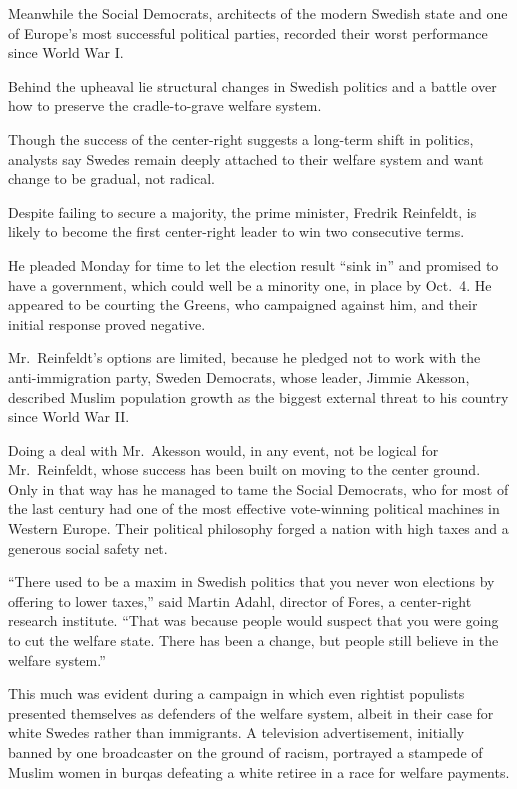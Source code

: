 ﻿\documentclass[12pt]{article}
\begin{document}
Meanwhile the Social Democrats, architects of the modern Swedish state and one of Europe's most
successful political parties, recorded their worst performance since World War I.

Behind the upheaval lie structural changes in Swedish politics and a battle over how to preserve the
cradle-to-grave welfare system.

Though the success of the center-right suggests a long-term shift in politics, analysts say Swedes
remain deeply attached to their welfare system and want change to be gradual, not radical.

Despite failing to secure a majority, the prime minister, Fredrik Reinfeldt, is likely to become the
first center-right leader to win two consecutive terms.

He pleaded Monday for time to let the election result ``sink in'' and promised to have a government,
which could well be a minority one, in place by Oct.~4. He appeared to be courting the Greens, who
campaigned against him, and their initial response proved negative.

Mr.~Reinfeldt's options are limited, because he pledged not to work with the anti-immigration party,
Sweden Democrats, whose leader, Jimmie Akesson, described Muslim population growth as the biggest
external threat to his country since World War II.

Doing a deal with Mr.~Akesson would, in any event, not be logical for Mr.~Reinfeldt, whose success
has been built on moving to the center ground. Only in that way has he managed to tame the Social
Democrats, who for most of the last century had one of the most effective vote-winning political
machines in Western Europe. Their political philosophy forged a nation with high taxes and a
generous social safety net.

``There used to be a maxim in Swedish politics that you never won elections by offering to lower
taxes,'' said Martin Adahl, director of Fores, a center-right research institute. ``That was because
people would suspect that you were going to cut the welfare state. There has been a change, but
people still believe in the welfare system.''

This much was evident during a campaign in which even rightist populists presented themselves as
defenders of the welfare system, albeit in their case for white Swedes rather than immigrants. A
television advertisement, initially banned by one broadcaster on the ground of racism, portrayed a
stampede of Muslim women in burqas defeating a white retiree in a race for welfare payments.
\end{document}
